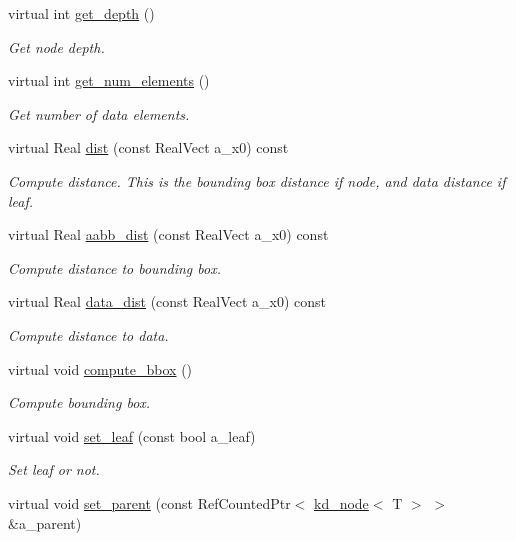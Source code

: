 \begin{DoxyCompactItemize}
virtual int \hyperlink{classkd__node_a96c582473680b65e223f2e3d8239b764}{get\+\_\+depth} ()
\begin{DoxyCompactList}\small\item\em Get node depth. \end{DoxyCompactList}\item 
virtual int \hyperlink{classkd__node_a9a240255649e278f40342eda80dd9b54}{get\+\_\+num\+\_\+elements} ()
\begin{DoxyCompactList}\small\item\em Get number of data elements. \end{DoxyCompactList}\item 
virtual Real \hyperlink{classkd__node_a2650fb7bd82b8251771f691b11a7b1a3}{dist} (const Real\+Vect a\+\_\+x0) const 
\begin{DoxyCompactList}\small\item\em Compute distance. This is the bounding box distance if node, and data distance if leaf. \end{DoxyCompactList}\item 
virtual Real \hyperlink{classkd__node_a91bcfcae80c64e3111681bd03e25dde3}{aabb\+\_\+dist} (const Real\+Vect a\+\_\+x0) const 
\begin{DoxyCompactList}\small\item\em Compute distance to bounding box. \end{DoxyCompactList}\item 
virtual Real \hyperlink{classkd__node_acad1b1246d729f722fe9101b05df3585}{data\+\_\+dist} (const Real\+Vect a\+\_\+x0) const 
\begin{DoxyCompactList}\small\item\em Compute distance to data. \end{DoxyCompactList}\item 
virtual void \hyperlink{classkd__node_a553d600845a25f2516d4043e046d8a4a}{compute\+\_\+bbox} ()
\begin{DoxyCompactList}\small\item\em Compute bounding box. \end{DoxyCompactList}\item 
virtual void \hyperlink{classkd__node_a8b52b113338f2b2f5c46e75c6e93f00d}{set\+\_\+leaf} (const bool a\+\_\+leaf)
\begin{DoxyCompactList}\small\item\em Set leaf or not. \end{DoxyCompactList}\item 
virtual void \hyperlink{classkd__node_a0a65b6741e55ad6dbbcdd6af4cf17947}{set\+\_\+parent} (const Ref\+Counted\+Ptr$<$ \hyperlink{classkd__node}{kd\+\_\+node}$<$ T $>$ $>$ \&a\+\_\+parent)

\end{DoxyCompactItemize}

